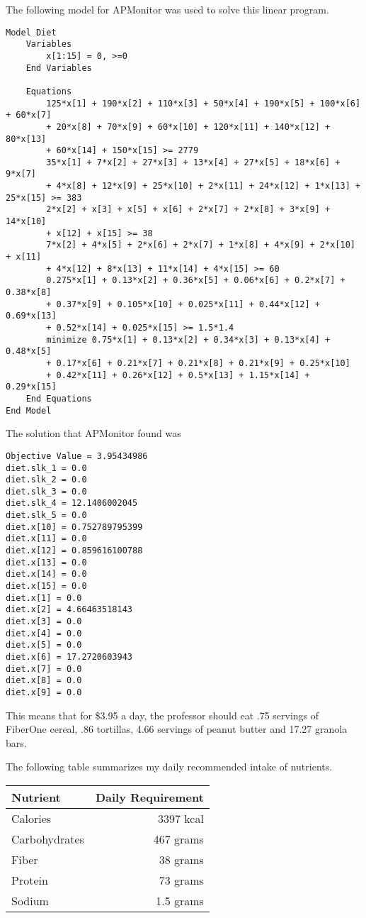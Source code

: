 \documentclass[11pt, oneside]{article}
\begin{document}
\noindent The following model for APMonitor was used to solve this linear program.

\begin{verbatim}
Model Diet
    Variables
        x[1:15] = 0, >=0
    End Variables

    Equations
        125*x[1] + 190*x[2] + 110*x[3] + 50*x[4] + 190*x[5] + 100*x[6] + 60*x[7]
        + 20*x[8] + 70*x[9] + 60*x[10] + 120*x[11] + 140*x[12] + 80*x[13]
        + 60*x[14] + 150*x[15] >= 2779
        35*x[1] + 7*x[2] + 27*x[3] + 13*x[4] + 27*x[5] + 18*x[6] + 9*x[7]
        + 4*x[8] + 12*x[9] + 25*x[10] + 2*x[11] + 24*x[12] + 1*x[13] + 25*x[15] >= 383
        2*x[2] + x[3] + x[5] + x[6] + 2*x[7] + 2*x[8] + 3*x[9] + 14*x[10]
        + x[12] + x[15] >= 38
        7*x[2] + 4*x[5] + 2*x[6] + 2*x[7] + 1*x[8] + 4*x[9] + 2*x[10] + x[11]
        + 4*x[12] + 8*x[13] + 11*x[14] + 4*x[15] >= 60
        0.275*x[1] + 0.13*x[2] + 0.36*x[5] + 0.06*x[6] + 0.2*x[7] + 0.38*x[8]
        + 0.37*x[9] + 0.105*x[10] + 0.025*x[11] + 0.44*x[12] + 0.69*x[13]
        + 0.52*x[14] + 0.025*x[15] >= 1.5*1.4
        minimize 0.75*x[1] + 0.13*x[2] + 0.34*x[3] + 0.13*x[4] + 0.48*x[5]
        + 0.17*x[6] + 0.21*x[7] + 0.21*x[8] + 0.21*x[9] + 0.25*x[10]
        + 0.42*x[11] + 0.26*x[12] + 0.5*x[13] + 1.15*x[14] + 0.29*x[15]
    End Equations
End Model
\end{verbatim}

\noindent The solution that APMonitor found was
\begin{verbatim}
Objective Value = 3.95434986
diet.slk_1 = 0.0
diet.slk_2 = 0.0
diet.slk_3 = 0.0
diet.slk_4 = 12.1406002045
diet.slk_5 = 0.0
diet.x[10] = 0.752789795399
diet.x[11] = 0.0
diet.x[12] = 0.859616100788
diet.x[13] = 0.0
diet.x[14] = 0.0
diet.x[15] = 0.0
diet.x[1] = 0.0
diet.x[2] = 4.66463518143
diet.x[3] = 0.0
diet.x[4] = 0.0
diet.x[5] = 0.0
diet.x[6] = 17.2720603943
diet.x[7] = 0.0
diet.x[8] = 0.0
diet.x[9] = 0.0
\end{verbatim}

This means that for \$3.95 a day, the professor should eat .75 servings of
FiberOne cereal, .86 tortillas, 4.66 servings of peanut butter and 17.27 granola bars.

The following table summarizes my daily recommended intake of nutrients.
\begin{center}
    \begin{tabular}{lr}
        \toprule
        Nutrient      & Daily Requirement \\
        \midrule
        Calories      & 3397 kcal \\
        Carbohydrates & 467 grams  \\
        Fiber         & 38 grams \\
        Protein       & 73 grams \\
        Sodium        & 1.5 grams \\
        \bottomrule
    \end{tabular}
\end{center}
\end{document}
